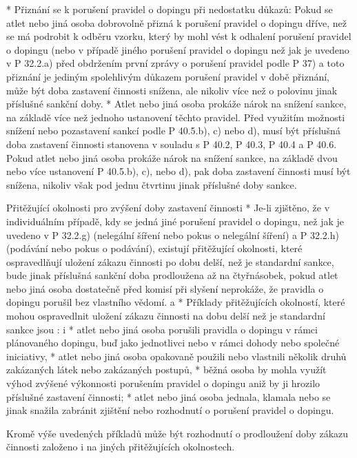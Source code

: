   * Přiznání se k porušení pravidel o dopingu při nedostatku důkazů: Pokud se atlet nebo jiná osoba dobrovolně přizná k porušení pravidel o dopingu dříve, než se má podrobit k odběru vzorku, který by mohl vést k odhalení porušení pravidel o dopingu (nebo v případě jiného porušení pravidel o dopingu než jak je uvedeno v P 32.2.a) před obdržením první zprávy o porušení pravidel podle P 37) a toto přiznání je jediným spolehlivým důkazem porušení pravidel v době přiznání, může být doba zastavení činnosti snížena, ale nikoliv více než o polovinu jinak příslušné sankční doby.
  * Atlet nebo jiná osoba prokáže nárok na snížení sankce, na základě více než jednoho ustanovení těchto pravidel. Před využitím možnosti snížení nebo pozastavení sankcí podle P 40.5.b), c) nebo d),  musí být příslušná doba zastavení činnosti stanovena v souladu s P 40.2, P 40.3, P 40.4 a P 40.6. Pokud atlet nebo jiná osoba prokáže nárok na snížení sankce, na základě dvou nebo více ustanovení P 40.5.b), c), nebo d), pak doba zastavení činnosti musí být snížena, nikoliv však pod jednu čtvrtinu jinak příslušné doby sankce.
  \enditems

Přitěžující okolnosti pro zvýšení doby zastavení činnosti
* Je-li zjištěno, že v individuálním případě, kdy se jedná jiné porušení pravidel o dopingu, než jak je uvedeno v P 32.2.g) (nelegální šíření nebo pokus o nelegální šíření) a P 32.2.h) (podávání nebo pokus o podávání), existují přitěžující okolnosti, které ospravedlňují uložení zákazu činnosti po dobu delší, než je standardní sankce, bude jinak příslušná sankční doba prodloužena až na čtyřnásobek, pokud atlet nebo jiná osoba dostatečně před komisí při slyšení neprokáže, že pravidla o dopingu porušil bez vlastního vědomí.
  \begitems \style a
  * Příklady přitěžujících okolností, které mohou ospravedlnit uložení zákazu činnosti na dobu delší než je standardní sankce jsou :
    \begitems \style i
    * atlet nebo jiná osoba porušili pravidla o dopingu v rámci plánovaného dopingu, buď jako jednotlivci nebo v rámci dohody nebo společné iniciativy,
    * atlet nebo jiná osoba opakovaně použili nebo vlastnili několik druhů zakázaných látek nebo zakázaných postupů,
    * běžná osoba by mohla využít výhod zvýšené výkonnosti porušením pravidel o dopingu aniž by ji hrozilo příslušné zastavení činnosti;
    * atlet nebo jiná osoba jednala, klamala nebo se jinak snažila zabránit zjištění nebo rozhodnutí o porušení pravidel o dopingu.
    \enditems

  Kromě výše uvedených příkladů může být rozhodnutí o prodloužení doby zákazu činnosti založeno i na jiných přitěžujících okolnostech.

